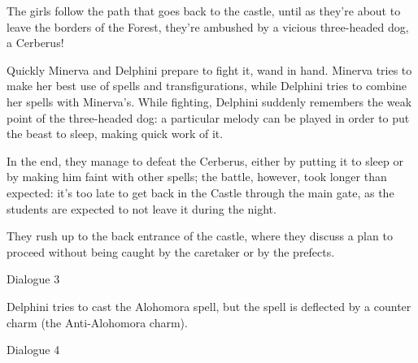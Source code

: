 The girls follow the path that goes back to the castle, until as they're about to leave the borders of the Forest, they're ambushed by a vicious three-headed dog, a Cerberus!\\


Quickly Minerva and Delphini prepare to fight it, wand in hand. Minerva tries to make her best use of spells and transfigurations, while Delphini tries to combine her spells with Minerva's. While fighting, Delphini suddenly remembers the weak point of the three-headed dog: a particular melody can be played in order to put the beast to sleep, making quick work of it.

In the end, they manage to defeat the Cerberus, either by putting it to sleep or by making him faint with other spells; the battle, however, took longer than expected: it's too late to get back in the Castle through the main gate, as the students are expected to not leave it during the night.

They rush up to the back entrance of the castle, where they discuss a plan to proceed without being caught by the caretaker or by the prefects.\\
  
\begin{dialogue}{Dialogue 3} 
\end{dialogue}

Delphini tries to cast the Alohomora spell, but the spell is deflected by a counter charm (the Anti-Alohomora charm).


\begin{dialogue}{Dialogue 4} 
\end{dialogue}

